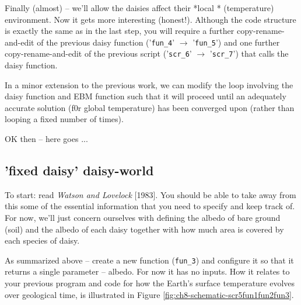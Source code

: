 \documentclass{tufte-book} %
\begin{document}
\begin{description}[align=right]
\item [8.2.3] Finally (almost) -- we'll allow the daisies affect their *local * (temperature) environment. Now it gets more interesting (honest!). Although the code structure is exactly the same as in the last step, you will require a further copy-rename-and-edit of the previous daisy function ('\texttt{fun\_4}' \(\rightarrow\) '\texttt{fun\_5}') and one further copy-rename-and-edit of the previous script ('\texttt{scr\_6}' \(\rightarrow\) '\texttt{scr\_7}') that calls the daisy function.

\item [8.2.4] In a minor extension to the previous work, we can modify the loop involving  the daisy function and EBM function such that it will proceed until an adequately accurate solution (f0r global temperature) has been converged upon (rather than looping a fixed number of times).  

\end{description}

OK then -- here goes ...


\subsection{'fixed daisy' daisy-world}

To start: read \textit{Watson and Lovelock} [1983]. You should be able to take away from this some of the essential information that you need to specify and keep track of. For now, we'll just concern ourselves with defining the albedo of bare ground (soil) and the albedo of each daisy together with how much area is covered by each species of daisy.

As summarized above -- create a new function (\texttt{fun\_3}) and configure it so that it returns a single parameter -- albedo. For now it has no inputs. How it relates to your previous program and code for how the Earth's surface temperature evolves over geological time, is illustrated in Figure \ref{fig:ch8-schematic-scr5fun1fun2fun3}.
\end{document}

